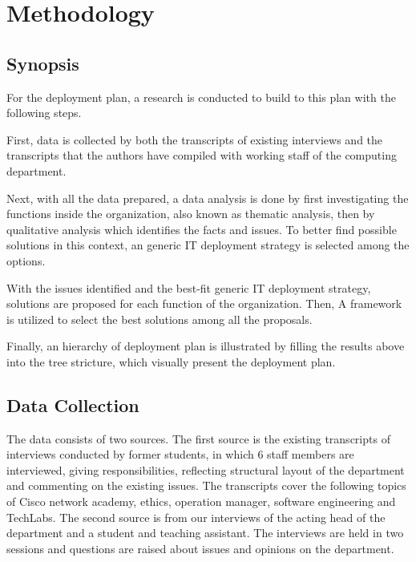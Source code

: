 
\section{Methodology}

\subsection{Synopsis}

For the deployment plan, a research is conducted to build to this plan with the following steps.

First, data is collected by both the transcripts of existing interviews and the transcripts that the authors have compiled with working staff of the computing department.

Next, with all the data prepared, a data analysis is done by first investigating the functions inside the organization, also known as thematic analysis, then by qualitative analysis which identifies the facts and issues. To better find possible solutions in this context, an generic IT deployment strategy is selected among the options.

With the issues identified and the best-fit generic IT deployment strategy, solutions are proposed for each function of the organization. Then, A framework is utilized to select the best solutions among all the proposals.

Finally, an hierarchy of deployment plan is illustrated by filling the results above into the tree stricture, which visually present the deployment plan.


\subsection{Data Collection}	
The data consists of two sources. The first source is the existing transcripts of interviews conducted by former students, in which 6 staff members are interviewed, giving responsibilities, reflecting structural layout of the department and commenting on the existing issues. The transcripts cover the following topics of Cisco network academy, ethics, operation manager, software engineering and TechLabs.
The second source is from our interviews of the acting head of the department and a student and teaching assistant. The interviews are held in two sessions and questions are raised about issues and opinions on the department.

